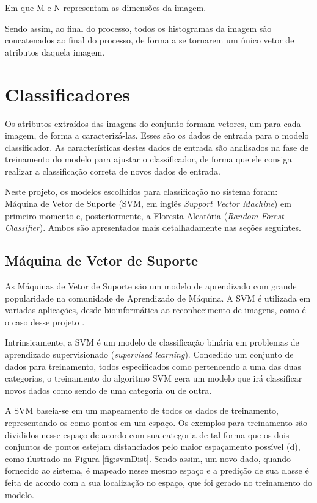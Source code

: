 Em que M e N representam as dimensões da imagem.

Sendo assim, ao final do processo, todos os histogramas da imagem são concatenados ao final do processo, de forma a se tornarem um único vetor de atributos daquela imagem.

\section{Classificadores}

Os atributos extraídos das imagens do conjunto formam vetores, um para cada imagem, de forma a caracterizá-las. Esses são os dados de entrada para o modelo classificador. As características destes dados de entrada são analisados na fase de treinamento do modelo para ajustar o classificador, de forma que ele consiga realizar a classificação correta de novos dados de entrada.

Neste projeto, os modelos escolhidos para classificação no sistema foram: Máquina de Vetor de Suporte (SVM, em inglês \textit{Support Vector Machine}) em primeiro momento e, posteriormente, a Floresta Aleatória (\textit{Random Forest Classifier}). Ambos são apresentados mais detalhadamente nas seções seguintes.

\subsection{Máquina de Vetor de Suporte}

As Máquinas de Vetor de Suporte são um modelo de aprendizado com grande popularidade na comunidade de Aprendizado de Máquina. A SVM é utilizada em variadas aplicações, desde bioinformática ao reconhecimento de imagens, como é o caso desse projeto   .

Intrinsicamente, a SVM é um modelo de classificação binária em problemas de aprendizado supervisionado (\textit{supervised learning}). Concedido um conjunto de dados para treinamento, todos especificados como pertencendo a uma das duas categorias, o treinamento do algoritmo SVM gera um modelo que irá classificar novos dados como sendo de uma categoria ou de outra.

A SVM baseia-se em um mapeamento de todos os dados de treinamento, representando-os como pontos em um espaço. Os exemplos para treinamento são divididos nesse espaço de acordo com sua categoria de tal forma que os dois conjuntos de pontos estejam distanciados pelo maior espaçamento possível (d), como ilustrado na Figura \ref{fig:svmDist}. Sendo assim, um novo dado, quando fornecido ao sistema, é mapeado nesse mesmo espaço e a predição de sua classe é feita de acordo com a sua localização no espaço, que foi gerado no treinamento do modelo.

